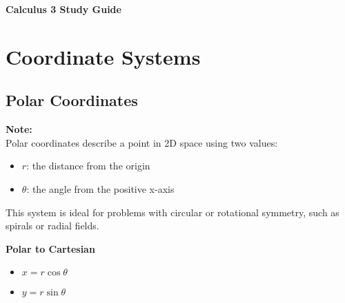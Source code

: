 \documentclass[10pt]{article}                               %
\begin{document}
\begin{center}
    {\Huge \textbf{Calculus 3 Study Guide}} \\
    \vspace{0.5em}
\end{center}

\vspace{1em}



\section*{Coordinate Systems}


\begin{adjustwidth}{2em}{0pt}

    \subsection*{Polar Coordinates}

    \begin{adjustwidth}{2em}{0pt}

        \begin{notebox}

            \textbf{Note:} \\
            Polar coordinates describe a point in 2D space using two values:

            \begin{itemize}
                \item \( r \): the distance from the origin
                \item \( \theta \): the angle from the positive x-axis
            \end{itemize}

            This system is ideal for problems with circular or rotational symmetry, such as spirals or radial fields.

        \end{notebox}


        \vspace{0.5em}

        \textbf{Polar to Cartesian}

        \begin{itemize}
            \item \( x = r\cos\theta \)
            \item \( y = r\sin\theta \)
        \end{itemize}


\end{adjustwidth}
\end{adjustwidth}
\end{document}
